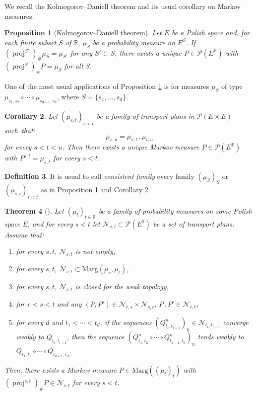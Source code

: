 \documentclass[10pt,a4paper]{article}
\renewcommand{\theenumi}{\alph{enumi}}
\renewcommand{\theenumii}{\roman{enumii}}
\newenvironment{enumeratei}
{\bgroup\def\theenumi{\roman{enumi}}\def\theenumii{\arabic{enumii}}\begin{enumerate}}
{\end{enumerate}\egroup}
\newcommand{\ldot}{\mathbin{.}}
\theoremstyle{plain}
\newtheorem{them}{Theorem}[section]
\newtheorem{pro}[them]{Proposition}
\newtheorem{cor}[them]{Corollary}
\theoremstyle{definition}
\newtheorem{defi}[them]{Definition}
\newcommand{\p}{\mathcal{P}}
\newcommand{\ma}{\mathrm{Marg}}
\newcommand{\R}{\mathbb{R}}
\newcommand{\pr}{\operatorname{proj}}
\begin{document}
We recall the Kolmogorov--Daniell theorem and its usual corollary on Markov measures.

\begin{pro}[Kolmogorov--Daniell theorem]\label{pro:inductive_limit}
Let $E$ be a Polish space and, for each finite subset $S$ of\/ $\R$, $\mu_S$ be a probability measure on $E^S$. If $(\pr^{S'})_\#\mu_S=\mu_{S'}$ for any $S'\subset S$, there exists a unique $P\in \p(E^\R)$ with $(\pr^S)_\#P=\mu_S$ for all $S$.
\end{pro}

One of the most usual applications of Proposition \ref{pro:inductive_limit} is for measures $\mu_S$ of type $\mu_{s_1,s_2}\circ\cdots\circ \mu_{s_{d-1},s_d}$, where $S=\{s_1,\ldots,s_d\}$.

\begin{cor}\label{cor:consist}
Let $(\mu_{s,t})_{s<t}$ be a family of transport plans in $\p(E\times E)$ such~that:\vspace*{-3pt}
\[\mu_{s,u}=\mu_{s,t}{}\ldot\mu_{t,u}\]
for every $s<t<u$. Then there exists a unique Markov measure $P\in \p(E^\R)$ with $P^{s,t}=\mu_{s,t}$ for every $s<t$.
\end{cor}

\begin{defi}\label{defi:consist}It is usual to call \emph{consistent family} every family $(\mu_S)_S$ or $(\mu_{s,t})_{s<t}$ as in Proposition \ref{pro:inductive_limit} and Corollary \ref{cor:consist}.
\end{defi}

\begin{them}[{\cite[Th.\,1]{Ke72}}]\label{them:existence}
Let $(\mu_t)_{t\in \R}$ be a family of probability measures on some Polish space $E$, and for every $s< t$ let $\mathcal{N}_{s,t}\subset\p(E^2)$ be a set of transport plans.
Assume that:
\begin{enumeratei}
\item\label{them:existence1}
for every $s,t$, $\mathcal{N}_{s,t}$ is not empty,
\item\label{them:existence2}
for every $s,t$, $\mathcal{N}_{s,t}\subset\ma(\mu_s,\mu_t)$,
\item\label{them:existence3}
for every $s,t$, $\mathcal{N}_{s,t}$ is closed for the weak topology,
\item\label{them:existence4}
for $r<s<t$ and any $(P,P')\in\mathcal{N}_{r,s}\times \mathcal{N}_{s,t}$, $P\ldot P'\in\mathcal{N}_{r,t}$,
\item\label{them:existence5}
 for every $d$ and $t_1<\cdots<t_d$, if the sequences $(Q^n_{t_i,t_{i+1}})_n\in \mathcal{N}_{t_i,t_{i+1}}$ converge weakly to $Q_{t_i,t_{i+1}}$, then the sequence $(Q^n_{t_1,t_2}\circ\cdots \circ Q^n_{t_{d-1},t_d})_{n}$ tends weakly to $Q_{t_1,t_2}\circ\cdots \circ Q_{t_{d-1},t_d}$.
\end{enumeratei}

Then, there exists a Markov measure $P\in\ma((\mu_t)_t)$ with $(\pr^{s,t})_\#P \in \mathcal{N}_{s,t}$ for every $s<t$.
\end{them}
\end{document}
